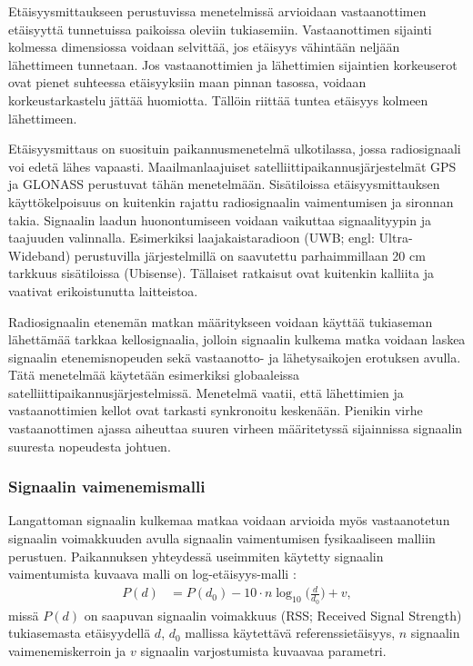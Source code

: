 Etäisyysmittaukseen perustuvissa menetelmissä arvioidaan
vastaanottimen etäisyyttä tunnetuissa paikoissa oleviin tukiasemiin.
Vastaanottimen sijainti kolmessa dimensiossa voidaan selvittää, jos etäisyys
vähintään neljään lähettimeen tunnetaan. Jos vastaanottimien ja lähettimien
sijaintien korkeuserot ovat pienet suhteessa etäisyyksiin maan pinnan tasossa,
voidaan korkeustarkastelu jättää huomiotta. Tällöin riittää tuntea etäisyys
kolmeen lähettimeen.

Etäisyysmittaus on suosituin paikannusmenetelmä
ulkotilassa, jossa radiosignaali voi edetä lähes vapaasti.
Maailmanlaajuiset satelliittipaikannusjärjestelmät GPS ja GLONASS
perustuvat tähän menetelmään.
Sisätiloissa
etäisyysmittauksen käyttökelpoisuus on kuitenkin rajattu radiosignaalin
vaimentumisen ja sironnan takia. Signaalin laadun huonontumiseen voidaan
vaikuttaa signaalityypin
ja taajuuden valinnalla. Esimerkiksi laajakaistaradioon (UWB; engl:
Ultra-Wideband) perustuvilla järjestelmillä on saavutettu parhaimmillaan
20 cm tarkkuus sisätiloissa (Ubisense). Tällaiset ratkaisut ovat
kuitenkin kalliita ja vaativat
erikoistunutta laitteistoa.

Radiosignaalin etenemän matkan määritykseen
voidaan käyttää tukiaseman lähettämää tarkkaa kellosignaalia, jolloin
signaalin kulkema matka voidaan laskea signaalin etenemisnopeuden sekä
vastaanotto- ja lähetysaikojen erotuksen avulla. Tätä menetelmää käytetään
esimerkiksi globaaleissa satelliittipaikannusjärjestelmissä. Menetelmä
vaatii, että lähettimien ja vastaanottimien kellot ovat tarkasti synkronoitu
keskenään. Pienikin virhe
vastaanottimen ajassa aiheuttaa suuren virheen määritetyssä sijainnissa
signaalin suuresta nopeudesta johtuen.

\subsubsection{Signaalin vaimenemismalli}

Langattoman signaalin kulkemaa matkaa voidaan arvioida myös vastaanotetun
signaalin voimakkuuden avulla signaalin vaimentumisen fysikaaliseen
malliin perustuen. Paikannuksen yhteydessä
useimmiten käytetty signaalin vaimentumista kuvaava malli on
log-etäisyys-malli \cite{fadjukoff2013}:
\begin{align}
  P(d) &= P(d_0) - 10 \cdot n \log_{10} \bigg( \frac{d}{d_0} \bigg) + v,
\end{align}
missä $P(d)$ on saapuvan signaalin voimakkuus (RSS; Received Signal Strength)
tukiasemasta etäisyydellä $d$, $d_0$ mallissa käytettävä referenssietäisyys,
$n$ signaalin vaimenemiskerroin ja $v$ signaalin varjostumista
kuvaavaa parametri.

